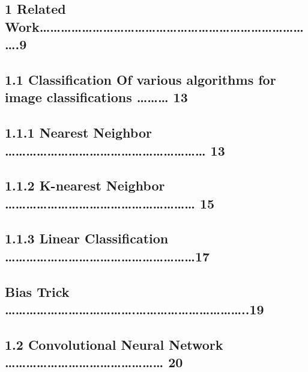 \documentclass{article} %
\begin{document}
\noindent 
\subsection{ 1 Related Work{\dots}{\dots}{\dots}{\dots}{\dots}{\dots}{\dots}{\dots}{\dots}{\dots}{\dots}{\dots}{\dots}{\dots}{\dots}{\dots}{\dots}{\dots}{\dots}{\dots}{\dots}{\dots}{\dots}{\dots}{\dots}{\dots}.9}

\noindent 
\subsection{        1.1 Classification Of various algorithms for image classifications {\dots}{\dots}{\dots} 13}


\subsection{            1.1.1 Nearest Neighbor {\dots}{\dots}{\dots}{\dots}{\dots}{\dots}{\dots}{\dots}{\dots}{\dots}{\dots}{\dots}{\dots}{\dots}{\dots}{\dots}{\dots}{\dots}{\dots} 13 }


\subsection{            1.1.2 K-nearest Neighbor {\dots}{\dots}{\dots}{\dots}{\dots}{\dots}{\dots}{\dots}{\dots}{\dots}{\dots}{\dots}{\dots}{\dots}{\dots}{\dots}{\dots}{\dots} 15}

\noindent 
\subsection{              1.1.3 Linear Classification {\dots}{\dots}{\dots}{\dots}{\dots}{\dots}{\dots}{\dots}{\dots}{\dots}{\dots}{\dots}{\dots}{\dots}{\dots}{\dots}{\dots}{\dots}17}

\noindent 
\subsection{                     Bias Trick {\dots}{\dots}{\dots}{\dots}{\dots}{\dots}{\dots}{\dots}{\dots}{\dots}{\dots}{\dots}.{\dots}{\dots}{\dots}{\dots}{\dots}{\dots}{\dots}{\dots}{\dots}{\dots}..19}

\noindent 
\subsection{         1.2 Convolutional Neural Network {\dots}{\dots}{\dots}{\dots}{\dots}{\dots}{\dots}{\dots}{\dots}{\dots}{\dots}{\dots}{\dots}{\dots}{\dots}   20}
\end{document}
